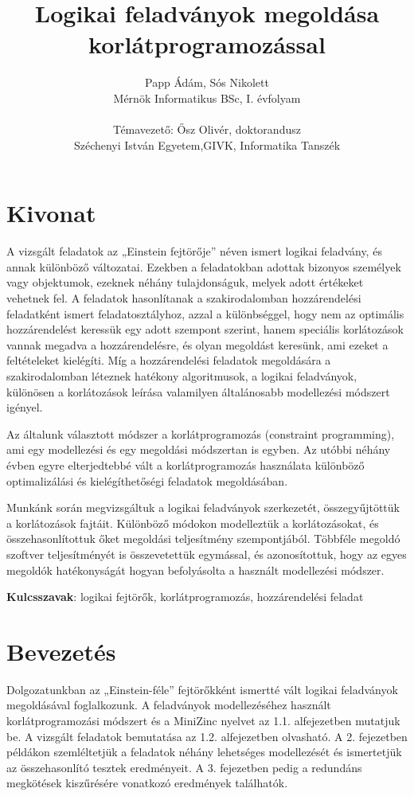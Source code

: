 \documentclass[12pt,a4paper,twoside, openright]{report}
\author{Papp Ádám, Sós Nikolett\\Mérnök Informatikus BSc, I. évfolyam\\\ \\Témavezető: Ősz Olivér, doktorandusz\\Széchenyi István Egyetem,GIVK, Informatika Tanszék}
\title{Logikai feladványok megoldása \\korlátprogramozással}
\begin{document}
\maketitle


\chapter*{Kivonat}

    A vizsgált feladatok az „Einstein fejtörője” néven ismert logikai feladvány, és annak különböző változatai.
    Ezekben a feladatokban adottak bizonyos személyek vagy objektumok, ezeknek néhány tulajdonságuk, melyek adott értékeket vehetnek fel.
    A feladatok hasonlítanak a szakirodalomban hozzárendelési feladatként ismert feladatosztályhoz, azzal a különbséggel, hogy nem az optimális hozzárendelést keressük egy adott szempont szerint, hanem speciális korlátozások vannak megadva a hozzárendelésre, és olyan megoldást keresünk, ami ezeket a feltételeket kielégíti.
    Míg a hozzárendelési feladatok megoldására a szakirodalomban léteznek hatékony algoritmusok, a logikai feladványok, különösen a korlátozások leírása valamilyen általánosabb modellezési módszert igényel.

    Az általunk választott módszer a korlátprogramozás (constraint programming), ami egy modellezési és egy megoldási módszertan is egyben.
    Az utóbbi néhány évben egyre elterjedtebbé vált a korlátprogramozás használata különböző optimalizálási és kielégíthetőségi feladatok megoldásában.

    Munkánk során megvizsgáltuk a logikai feladványok szerkezetét, összegyűjtöttük a korlátozások fajtáit.
    Különböző módokon modelleztük a korlátozásokat, és összehasonlítottuk őket megoldási teljesítmény szempontjából.
    Többféle megoldó szoftver teljesítményét is összevetettük egymással, és azonosítottuk, hogy az egyes megoldók hatékonyságát hogyan befolyásolta a használt modellezési módszer.

    \textbf{Kulcsszavak}: logikai fejtörők, korlátprogramozás, hozzárendelési feladat


\tableofcontents


\chapter{Bevezetés}

    Dolgozatunkban az „Einstein-féle” fejtörőkként ismertté vált logikai feladványok megoldásával foglalkozunk.
    A feladványok modellezéséhez használt korlátprogramozási módszert és a MiniZinc nyelvet az 1.1. alfejezetben mutatjuk be.
    A vizsgált feladatok bemutatása az 1.2. alfejezetben olvasható.
    A 2. fejezetben példákon szemléltetjük a feladatok néhány lehetséges modellezését és ismertetjük az összehasonlító tesztek eredményeit.
    A 3. fejezetben pedig a redundáns megkötések kiszűrésére vonatkozó eredmények találhatók.
\end{document}
